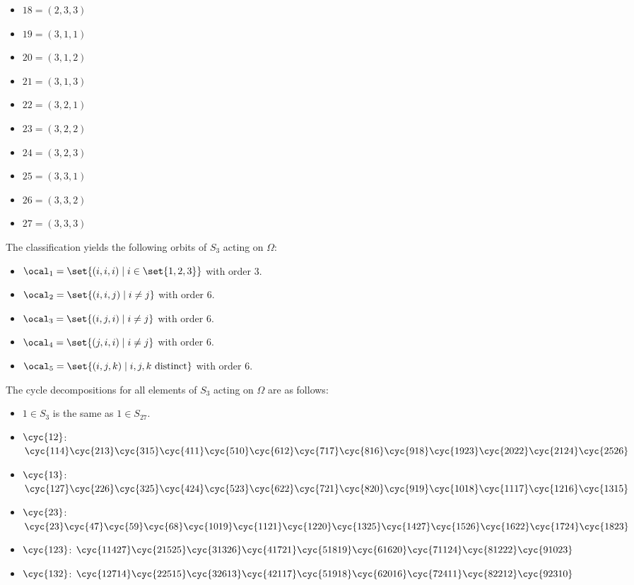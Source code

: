 \begin{solenum}
\begin{itemize}
        \item $18 = (2, 3, 3)$
        \item $19 = (3, 1, 1)$
        \item $20 = (3, 1, 2)$
        \item $21 = (3, 1, 3)$
        \item $22 = (3, 2, 1)$
        \item $23 = (3, 2, 2)$
        \item $24 = (3, 2, 3)$
        \item $25 = (3, 3, 1)$
        \item $26 = (3, 3, 2)$
        \item $27 = (3, 3, 3)$
    \end{itemize}
	The classification yields the following orbits of $S_3$ acting on $\Omega$:
	\begin{itemize}
		\item $\ocal_1 = \set{(i, i, i) \mid i \in \set{1, 2, 3}}$ with order 3.
		\item $\ocal_2 = \set{(i, i, j) \mid i \neq j}$ with order 6.
		\item $\ocal_3 = \set{(i, j, i) \mid i \neq j}$ with order 6.
		\item $\ocal_4 = \set{(j, i, i) \mid i \neq j}$	with order 6.
		\item $\ocal_5 = \set{(i, j, k) \mid i, j, k \text{ distinct}}$ with order 6.
	\end{itemize}
	The cycle decompositions for all elements of $S_3$ acting on $\Omega$ are as follows:
	\begin{itemize}
		\item $1 \in S_3$ is the same as $1 \in S_{27}$.
		\item $\cyc{1 2}$: $\cyc{1 14}\cyc{2 13}\cyc{3 15}\cyc{4 11}\cyc{5 10}\cyc{6 12}\cyc{7 17}\cyc{8 16}\cyc{9 18}\cyc{19 23}\cyc{20 22}\cyc{21 24}\cyc{25 26}$
		\item $\cyc{1 3}$: $\cyc{1 27}\cyc{2 26}\cyc{3 25}\cyc{4 24}\cyc{5 23}\cyc{6 22}\cyc{7 21}\cyc{8 20}\cyc{9 19}\cyc{10 18}\cyc{11 17}\cyc{12 16}\cyc{13 15}$
		\item $\cyc{2 3}$: $\cyc{2 3}\cyc{4 7}\cyc{5 9}\cyc{6 8}\cyc{10 19}\cyc{11 21}\cyc{12 20}\cyc{13 25}\cyc{14 27}\cyc{15 26}\cyc{16 22}\cyc{17 24}\cyc{18 23}$
		\item $\cyc{1 2 3}$: $\cyc{1 14 27}\cyc{2 15 25}\cyc{3 13 26}\cyc{4 17 21}\cyc{5 18 19}\cyc{6 16 20}\cyc{7 11 24}\cyc{8 12 22}\cyc{9 10 23}$
		\item $\cyc{1 3 2}$: $\cyc{1 27 14}\cyc{2 25 15}\cyc{3 26 13}\cyc{4 21 17}\cyc{5 19 18}\cyc{6 20 16}\cyc{7 24 11}\cyc{8 22 12}\cyc{9 23 10}$

\end{itemize}
\end{solenum}
